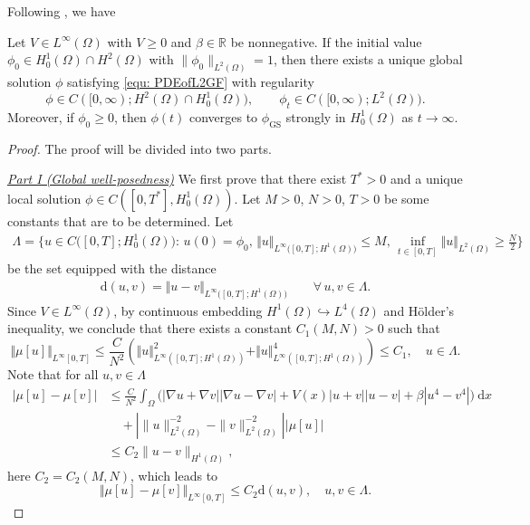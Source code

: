 \documentclass{siamart250211}
\def\R{\mathbb{R}}
\begin{document}
Following \cite{antonelli2024existence}, we have
\begin{theorem}\label{thm: wellposedness of model problem}
	Let $V \in L^{\infty}(\Omega)$ with $V \ge 0$ and $\beta \in \R$ be nonnegative. If the initial value $\phi_0 \in H_0^1(\Omega)\cap H^2(\Omega)$ with $\|\phi_0\|_{L^2(\Omega)}=1$, then there exists a unique global solution $\phi$ satisfying \eqref{equ: PDEofL2GF} with regularity
	\begin{equation*}
		\phi \in C([0,\infty); H^2(\Omega) \cap H_0^1(\Omega)), \qquad \phi_t \in C([0,\infty); L^2(\Omega) ).
	\end{equation*}
	Moreover, if $\phi_0 \ge 0$, then $\phi(t)$ converges to $\phi_{\text{GS}}$ strongly in $H_0^1(\Omega)$ as $t \to \infty$.
\end{theorem}
\begin{proof}
The proof will be divided into two parts.

\underline{\textit{Part I (Global well-posedness)}} We first prove that there exist $T^*>0$ and a unique local solution $\phi\in C([0,T^*],H_0^1(\Omega))$. Let $M>0$, $N > 0$, $T > 0$ be some constants that are to be determined. Let 
\begin{align*}
    \Lambda = \Big\{ u\in C\big([0,T];H_0^1({\Omega})\big):\, u(0) = \phi_0, \, \Vert u \Vert_{L^\infty\big([0,T];H^1({\Omega})\big)}\leq M,\,\inf_{t\in[0,T]}\Vert u \Vert_{L^2(\Omega)}\geq\frac{N}{2}\Big\}
\end{align*}
be the set equipped with the distance
\begin{align*}
    \text{d}(u,v)=\Vert u-v \Vert_{L^\infty\big([0,T];H^1({\Omega})\big)} \qquad \forall\, u,v \in \Lambda.
\end{align*}
Since $V\in L^\infty(\Omega)$, by continuous embedding $H^1(\Omega)\hookrightarrow L^4(\Omega)$ and H\"older's inequality, we conclude that there exists a constant $C_1(M,N)>0$ such that 
\begin{equation}\label{mues}
    \Vert\mu[u]\Vert_{L^\infty[0,T]}\le \frac{C}{N^2}\left(\Vert u\Vert_{L^\infty([0,T];H^1(\Omega))}^2+\Vert u\Vert_{L^\infty([0,T];H^1(\Omega))}^{4}\right)\leq C_1,\hspace{1em}u\in \Lambda.
\end{equation}
Note that for all $u,v \in \Lambda$
\begin{align*}
    \left| \mu[u] - \mu[v] \right| & \le \frac{C}{N^2} \int_{\Omega} \Big(  |\nabla u + \nabla  v||\nabla u - \nabla  v| + V(x)|u+v||u-v| + \beta |u^4 - v^4| \Big) \ \text{d}x   \\
    & \quad + \left| \|u\|_{L^2(\Omega)}^{-2} -  \|v\|_{L^2(\Omega)}^{-2}\right||\mu[u]| \\
    & \le C_2\|u-v\|_{H^1(\Omega)},
\end{align*}
here $C_2 = C_2(M,N)$, which leads to 
\begin{equation}\label{61}
    \Vert \mu[u]-\mu[v]\Vert_{L^\infty[0,T]}\leq C_2 \text{d}(u,v),\hspace{1em}u,v\in \Lambda.
\end{equation}
    

\end{proof}
\end{document}
